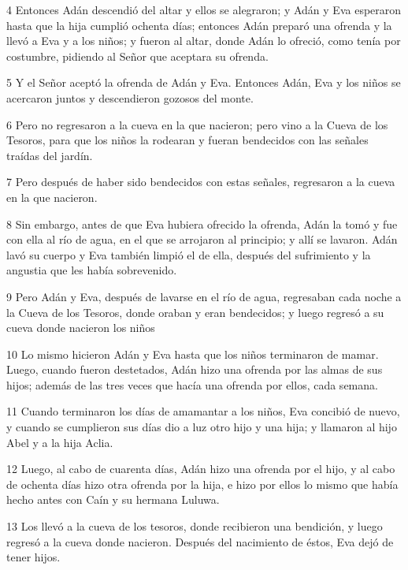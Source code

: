 \par 4 Entonces Adán descendió del altar y ellos se alegraron; y Adán y Eva esperaron hasta que la hija cumplió ochenta días; entonces Adán preparó una ofrenda y la llevó a Eva y a los niños; y fueron al altar, donde Adán lo ofreció, como tenía por costumbre, pidiendo al Señor que aceptara su ofrenda.

\par 5 Y el Señor aceptó la ofrenda de Adán y Eva. Entonces Adán, Eva y los niños se acercaron juntos y descendieron gozosos del monte.

\par 6 Pero no regresaron a la cueva en la que nacieron; pero vino a la Cueva de los Tesoros, para que los niños la rodearan y fueran bendecidos con las señales traídas del jardín.

\par 7 Pero después de haber sido bendecidos con estas señales, regresaron a la cueva en la que nacieron.

\par 8 Sin embargo, antes de que Eva hubiera ofrecido la ofrenda, Adán la tomó y fue con ella al río de agua, en el que se arrojaron al principio; y allí se lavaron. Adán lavó su cuerpo y Eva también limpió el de ella, después del sufrimiento y la angustia que les había sobrevenido.

\par 9 Pero Adán y Eva, después de lavarse en el río de agua, regresaban cada noche a la Cueva de los Tesoros, donde oraban y eran bendecidos; y luego regresó a su cueva donde nacieron los niños

\par 10 Lo mismo hicieron Adán y Eva hasta que los niños terminaron de mamar. Luego, cuando fueron destetados, Adán hizo una ofrenda por las almas de sus hijos; además de las tres veces que hacía una ofrenda por ellos, cada semana.

\par 11 Cuando terminaron los días de amamantar a los niños, Eva concibió de nuevo, y cuando se cumplieron sus días dio a luz otro hijo y una hija; y llamaron al hijo Abel y a la hija Aclia.

\par 12 Luego, al cabo de cuarenta días, Adán hizo una ofrenda por el hijo, y al cabo de ochenta días hizo otra ofrenda por la hija, e hizo por ellos lo mismo que había hecho antes con Caín y su hermana Luluwa.

\par 13 Los llevó a la cueva de los tesoros, donde recibieron una bendición, y luego regresó a la cueva donde nacieron. Después del nacimiento de éstos, Eva dejó de tener hijos.

